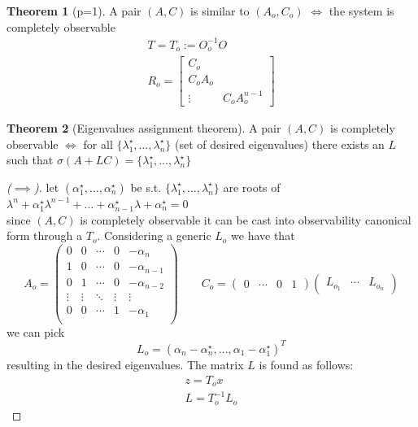\documentclass{book}
\theoremstyle{definition}
\newtheorem{theorem}{Theorem}[section]
\theoremstyle{remark}
\theoremstyle{remark}
\begin{document}
\begin{theorem}[p=1]
    A pair $(A,C)$ is similar to $(A_o,C_o)$ $\iff$ the system is completely observable
    \begin{gather*}
        T=T_o:=O_o^{-1}O\\
        R_o=\begin{bmatrix}
            C_o \\ C_oA_o \\ \vdots & C_oA_o^{n-1}
            \end{bmatrix}
    \end{gather*}

\end{theorem}


\begin{theorem}[Eigenvalues assignment theorem]
    A pair $(A,C)$ is completely observable $\iff$ for all \(\{\lambda_1^{\star},\dots,\lambda_n^{\star}\}\) (set of desired eigenvalues) there exists an $L$ such that $\sigma(A+LC)=\{\lambda_1^{\star},\dots,\lambda_n^{\star}\}$
\end{theorem}
\begin{proof}[($\implies$)]
    let $(\alpha_1^{\star},\dots,\alpha_n^{\star})$ be s.t. $\{\lambda_1^{\star},\dots,\lambda_n^{\star}\}$ are roots of $\lambda^n+\alpha_1^{\star}\lambda^{n-1}+\dots+\alpha_{n-1}^{\star}\lambda +\alpha_n^{\star}=0$ \\
    since $(A,C)$ is completely observable it can be cast into observability canonical form through a $T_o$. Considering a generic $L_o$ we have that
    \[
        A_o=\begin{pmatrix}
            0 & 0 & \cdots & 0 & -\alpha_n \\
            1 & 0 & \cdots & 0 & -\alpha_{n-1} \\
            0 & 1 & \cdots & 0 & -\alpha_{n-2} \\
            \vdots & \vdots & \ddots & \vdots & \vdots \\
            0 & 0 & \cdots & 1 & -\alpha_1 \\
        \end{pmatrix} \qquad C_o=\begin{pmatrix}
            0 & \cdots & 0 & 1
        \end{pmatrix} \begin{pmatrix}
    L_{o_1} & \cdots & L_{o_n}
\end{pmatrix}
    \]
    we can pick
        \[
    L_o=(\alpha_n-\alpha_n^{\star},\dots,\alpha_1-\alpha_1^{\star})^T
    \]
    resulting in the desired eigenvalues. The matrix $L$ is found as follows:
    \begin{gather*}
        z=T_ox \\
        L=T_o^{-1}L_o
    \end{gather*}
    
\end{proof}
\end{document}
